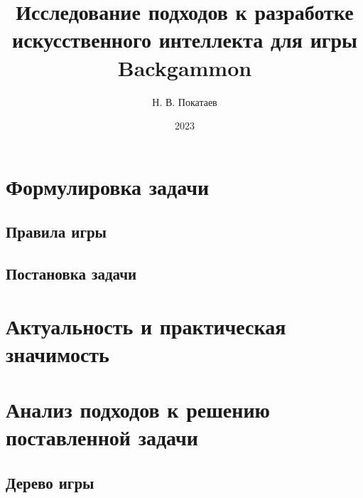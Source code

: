 \documentclass[14pt, a4paper]{extarticle}
\title{Исследование подходов к разработке искусственного интеллекта для игры Backgammon}
\author{Н. В. Покатаев}
\date{2023}
\begin{document}
\maketitle

\tableofcontents



\section{Формулировка задачи}

\subsection{Правила игры}


\subsection{Постановка задачи}


\section{Актуальность и практическая значимость}


\section{Анализ подходов к решению поставленной задачи}

\subsection{Дерево игры}





\end{document}
